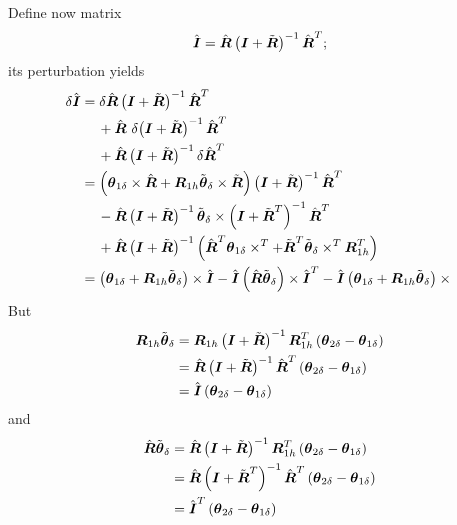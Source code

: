 \documentclass[10pt,dvips,fleqn]{report}
\newcommand{\T}[1]{\boldsymbol{#1}}
\begin{document}
Define now matrix
\begin{equation}
	\hat{\T{I}} =
		\hat{\T{R}} \plbr{\T{I} + \tilde{\T{R}}}^{-1} \hat{\T{R}}^T ;
\end{equation}
its perturbation yields
\begin{align}
	\delta\hat{\T{I}}
	&= \delta\hat{\T{R}} \plbr{\T{I} + \tilde{\T{R}}}^{-1} \hat{\T{R}}^T
	\nonumber \\
	& \mbox{\hspace{12pt}}
	+ \hat{\T{R}} \ \delta\! \plbr{\T{I} + \tilde{\T{R}}}^{-1} \hat{\T{R}}^T
	\nonumber \\
	& \mbox{\hspace{12pt}}
	+ \hat{\T{R}} \plbr{\T{I} + \tilde{\T{R}}}^{-1} \delta\hat{\T{R}}^T \\
	&= \plbr{
		\T{\theta}_{1\delta} \times \hat{\T{R}}
		+ \T{R}_{1h} \tilde{\T{\theta}}_{\delta} \times \tilde{\T{R}}
	} \plbr{\T{I} + \tilde{\T{R}}}^{-1} \hat{\T{R}}^T
	\nonumber \\
	& \mbox{\hspace{12pt}}
	- \hat{\T{R}} \plbr{\T{I} + \tilde{\T{R}}}^{-1}
		\tilde{\T{\theta}}_{\delta} \times
		\plbr{\T{I} + \tilde{\T{R}}^T}^{-1}
		\hat{\T{R}}^T
	\nonumber \\
	& \mbox{\hspace{12pt}}
	+ \hat{\T{R}} \plbr{\T{I} + \tilde{\T{R}}}^{-1} \plbr{
		\hat{\T{R}}^T \T{\theta}_{1\delta} \times^T
		+ \tilde{\T{R}}^T \tilde{\T{\theta}}_{\delta} \times^T \T{R}_{1h}^T
	} \\
	&= \plbr{
		\T{\theta}_{1\delta}
		+ \T{R}_{1h} \tilde{\T{\theta}}_{\delta}
	} \times \hat{\T{I}}
	- \hat{\T{I}} \plbr{\hat{\T{R}} \tilde{\T{\theta}}_{\delta}} \times \hat{\T{I}}^T
	- \hat{\T{I}} \plbr{
		\T{\theta}_{1\delta}
		+ \T{R}_{1h} \tilde{\T{\theta}}_{\delta}
	}\times{}
\end{align}
But
\begin{align}
	\T{R}_{1h} \tilde{\T{\theta}}_{\delta}
	&= \T{R}_{1h} \plbr{\T{I} + \tilde{\T{R}}}^{-1} \T{R}_{1h}^T \plbr{
		\T{\theta}_{2\delta} - \T{\theta}_{1\delta}
	} \\
	&= \hat{\T{R}} \plbr{\T{I} + \tilde{\T{R}}}^{-1} \hat{\T{R}}^T \plbr{
		\T{\theta}_{2\delta} - \T{\theta}_{1\delta}
	} \\
	&= \hat{\T{I}} \plbr{
		\T{\theta}_{2\delta} - \T{\theta}_{1\delta}
	} 
\end{align}
and
\begin{align}
	\hat{\T{R}} \tilde{\T{\theta}}_{\delta}
	&= \hat{\T{R}} \plbr{\T{I} + \tilde{\T{R}}}^{-1} \T{R}_{1h}^T \plbr{
		\T{\theta}_{2\delta} - \T{\theta}_{1\delta}
	} \\
	&= \hat{\T{R}} \plbr{\T{I} + \tilde{\T{R}}^T}^{-1} \hat{\T{R}}^T \plbr{
		\T{\theta}_{2\delta} - \T{\theta}_{1\delta}
	} \\
	&= \hat{\T{I}}^T \plbr{
		\T{\theta}_{2\delta} - \T{\theta}_{1\delta}
	} 
\end{align}
\end{document}
